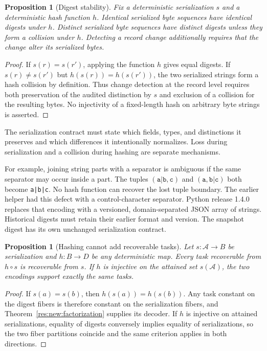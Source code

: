\documentclass[11pt,oneside]{article}
\theoremstyle{komorebiplain}
\newtheorem{proposition}[theorem]{Proposition}
\theoremstyle{komorebidefinition}
\theoremstyle{komorebiremark}
\begin{document}
\begin{proposition}[Digest stability]
\label{res:16:3}
Fix a deterministic serialization $s$ and a deterministic hash function $h$. Identical serialized byte sequences have identical digests under $h$. Distinct serialized byte sequences have distinct digests unless they form a collision under $h$. Detecting a record change additionally requires that the change alter its serialized bytes.
\end{proposition}

\begin{proof}
If $s(r)=s(r')$, applying the function $h$ gives equal digests. If $s(r)\ne s(r')$ but $h(s(r))=h(s(r'))$, the two serialized strings form a hash collision by definition. Thus change detection at the record level requires both preservation of the audited distinction by $s$ and exclusion of a collision for the resulting bytes. No injectivity of a fixed-length hash on arbitrary byte strings is asserted.
\end{proof}


The serialization contract must state which fields, types, and distinctions it preserves and which differences it intentionally normalizes. Loss during serialization and a collision during hashing are separate mechanisms.

For example, joining string parts with a separator is ambiguous if the same separator may occur inside a part. The tuples $(\texttt{a|b},\texttt{c})$ and $(\texttt{a},\texttt{b|c})$ both become \texttt{a|b|c}. No hash function can recover the lost tuple boundary. The earlier  helper had this defect with a control-character separator. Python release 1.4.0 replaces that encoding with a versioned, domain-separated JSON array of strings. Historical digests must retain their earlier format and version. The snapshot digest has its own unchanged serialization contract.

\begin{proposition}[Hashing cannot add recoverable tasks]
\label{res:new:hash}
Let $s:\mathscr A\to B$ be serialization and $h:B\to D$ be any deterministic map. Every task recoverable from $h\circ s$ is recoverable from $s$. If $h$ is injective on the attained set $s(\mathscr A)$, the two encodings support exactly the same tasks.
\end{proposition}
\begin{proof}
If $s(a)=s(b)$, then $h(s(a))=h(s(b))$. Any task constant on the digest fibers is therefore constant on the serialization fibers, and Theorem~\ref{res:new:factorization} supplies its decoder. If $h$ is injective on attained serializations, equality of digests conversely implies equality of serializations, so the two fiber partitions coincide and the same criterion applies in both directions.
\end{proof}
\end{document}
